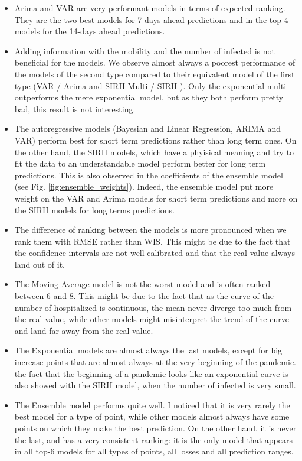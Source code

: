 \begin{itemize}
    \item Arima and VAR are very performant models in terms of expected ranking. They are the two best models for 7-days ahead predictions and in the top 4 models for the 14-days ahead predictions. 
    \item Adding information with the mobility and the number of infected is not beneficial for the models. We observe almost always a poorest performance of the models of the second type compared to their equivalent model of the first type (VAR / Arima and SIRH Multi / SIRH ). Only the exponential multi outperforms the mere exponential model, but as they both perform pretty bad, this result is not interesting. 
    \item The autoregressive models (Bayesian and Linear Regression, ARIMA and VAR) perform best for short term predictions rather than long term ones. On the other hand, the SIRH models, which have a phyisical meaning and try to fit the data to an understandable model perform better for long term predictions. This is also observed in the coefficients of the ensemble model (see Fig. \ref{fig:ensemble_weights}). Indeed, the ensemble model put more weight on the VAR and Arima models for short term predictions and more on the SIRH models for long terms predictions.  
    \item The difference of ranking between the models is more pronounced when we rank them with RMSE rather than WIS. This might be due to the fact that the confidence intervals are not well calibrated and that the real value always land out of it. 
    \item The Moving Average model is not the worst model and is often ranked between 6 and 8. This might be due to the fact that as the curve of the number of hospitalized is continuous, the mean never diverge too much from the real value, while other models might misinterpret the trend of the curve and land far away from the real value. 
    \item The Exponential models are almost always the last models, except for big increase points that are almost always at the very beginning of the pandemic. the fact that the beginning of a pandemic looks like an exponential curve is also showed with the SIRH model, when the number of infected is very small. 
    \item The Ensemble model performs quite well. I noticed that it is very rarely the best model for a type of point, while other models almost always have some points on which they make the best prediction. On the other hand, it is never the last, and has a very consistent ranking: it is the only model that appears in all top-6 models for all types of points, all losses and all prediction ranges.
\end{itemize}




